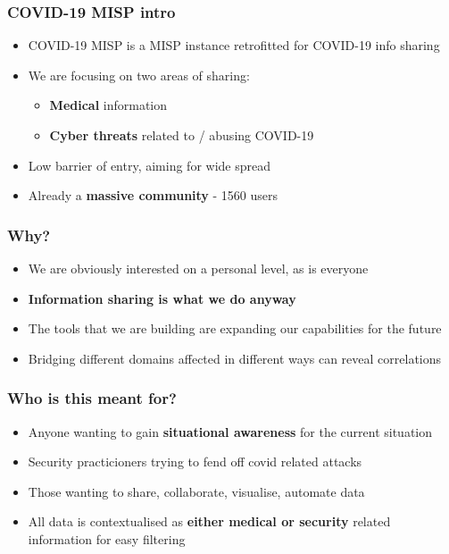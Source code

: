 
\begin{frame}[t,plain]
\titlepage
\end{frame}

\begin{frame}
 \frametitle{COVID-19 MISP intro}
 \begin{itemize}
         \item COVID-19 MISP is a MISP instance retrofitted for COVID-19 info sharing
         \item We are focusing on two areas of sharing:
         \begin{itemize}
              \item {\bf Medical} information
              \item {\bf Cyber threats} related to / abusing COVID-19
         \end{itemize}
         \item Low barrier of entry, aiming for wide spread
         \item Already a {\bf massive community} - 1560 users
 \end{itemize}
\end{frame}

\begin{frame}
 \frametitle{Why?}
 \begin{itemize}
         \item We are obviously interested on a personal level, as is everyone
         \item {\bf Information sharing is what we do anyway}
         \item The tools that we are building are expanding our capabilities for the future
         \item Bridging different domains affected in different ways can reveal correlations
 \end{itemize}
\end{frame}

\begin{frame}
 \frametitle{Who is this meant for?}
 \begin{itemize}
         \item Anyone wanting to gain {\bf situational awareness} for the current situation
         \item Security practicioners trying to fend off covid related attacks
         \item Those wanting to share, collaborate, visualise, automate data
         \item All data is contextualised as {\bf either medical or security} related information for easy filtering
 \end{itemize}
\end{frame}


